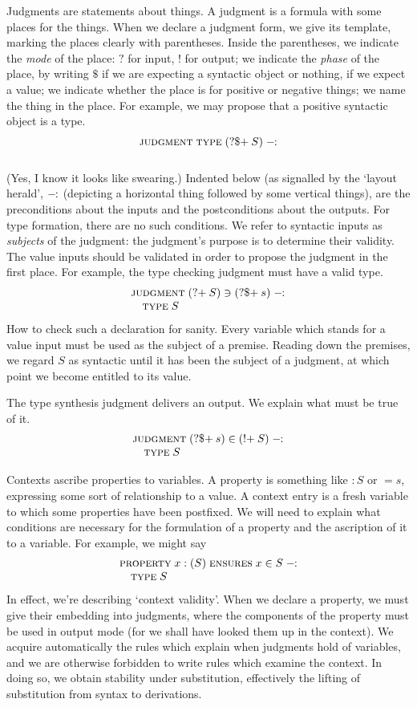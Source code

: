 \documentclass{article}
\begin{document}
Judgments are statements about things. A judgment is a formula with some places for the things. When we declare a judgment form, we give its template, marking the places clearly with parentheses. Inside the parentheses, we indicate the \emph{mode} of the place: $?$ for input, $!$ for output; we indicate the \emph{phase} of the place, by writing $\$$ if we are expecting a syntactic object or nothing, if we expect a value; we indicate whether the place is for positive or negative things;
we name the thing in the place. For example, we may propose that a positive syntactic object is a type.
\[
\lay{\judgment \type (?\$\pve\:S)}{}
\]
(Yes, I know it looks like swearing.)
Indented below (as signalled by the `layout herald', $-\!\!:$ (depicting a horizontal thing followed by some vertical things), are the preconditions about
the inputs and the postconditions about the outputs.
For type formation, there are no such conditions. We refer to syntactic inputs
as \emph{subjects} of the judgment: the judgment's purpose is to determine their validity. The value inputs should be validated in order to propose the judgment in the first place. For example, the type checking judgment must have a valid type.
\[
\lay{\judgment (?\pve\: S) \ni (?\$\pve\:s)}
  {\type S}
\]
How to check such a declaration for sanity. Every variable which stands for a value
input must be used as the subject of a premise. Reading down the premises, we regard
$S$ as syntactic until it has been the subject of a judgment, at which point we become entitled to its value.

The type synthesis judgment delivers an output. We explain what must be true of it.
\[
\lay{\judgment  (?\$\nve\:s) \in (!\pve\:S)}
  {\type S}
\]


Contexts ascribe properties to variables. 
A property is something like $:S$ or $=s$, expressing some sort of relationship to
a value. A context entry is a fresh variable to which some properties have been postfixed. We will need to explain what conditions are necessary for the formulation of a property and the ascription of it to a variable. For example, we might say
\newcommand{\property}{\textsc{property}\;}
\newcommand{\ensures}{\;\textsc{ensures}\;}
\[
\lay{\property x : (S)\ensures x\in S}
  {\type S}
\]
In effect, we're describing `context validity'. When we declare
a property, we must give their embedding into judgments, where the components of the property must be used in output mode (for we shall have looked them up in the context). We acquire automatically the rules which explain when judgments hold of variables, and we are otherwise forbidden to write rules which examine the context.
In doing so, we obtain stability under substitution, effectively the lifting of substitution from syntax to derivations.
\end{document}

